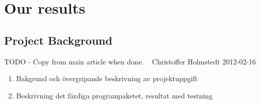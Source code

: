 


\section{Our results}
\subsection{Project Background}
TODO - Copy from main article when done. ~ Christoffer Holmstedt 2012-02-16
\begin{enumerate}
\item Bakgrund och övergripande beskrivning av projektuppgift
\item Beskrivning det färdiga programpaketet, resultat med testning 
\end{enumerate}
